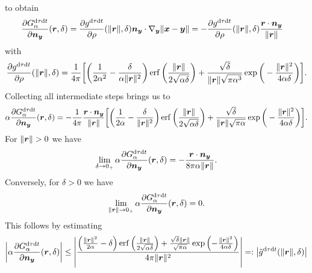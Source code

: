\documentclass[a4paper,11pt]{article}
\begin{document}
to obtain
\begin{equation}
\label{eq:dn_G_dt_dtau}
\begin{aligned}
  \frac{\partial G^{{\mathrm{d}}\tau{\mathrm{d}} t}_\alpha}{\partial {\ensuremath{{\bm{n}}}}_{{\bm{y}}}}({{\bm{r}}},\delta) &= \frac{\partial g^{{\mathrm{d}}\tau{\mathrm{d}} t}}{\partial \rho}(\|{{\bm{r}}}\|,\delta) {{\bm{n}}}_{{\bm{y}}} \cdot \nabla_{{\bm{y}}} \|{{\bm{x}}}-{{\bm{y}}}\| 
  = - \frac{\partial g^{{\mathrm{d}}\tau{\mathrm{d}} t}}{\partial \rho}(\|{{\bm{r}}}\|,\delta) \frac{ {{\bm{r}}} \cdot {\ensuremath{{\bm{n}}}}_{{\bm{y}}}}{\| {{\bm{r}}}\|}
\end{aligned}
\end{equation}
with
\begin{equation*}
  \frac{\partial g^{{\mathrm{d}}\tau{\mathrm{d}} t}}{\partial \rho}(\|{{\bm{r}}}\|,\delta) =\frac{1}{4\pi} \bigg[  \bigg( \frac{1}{2\alpha^2} - \frac{\delta}{\alpha\|{{\bm{r}}}\|^2} \bigg) \operatorname{erf}\bigg( \frac{\|{{\bm{r}}}\|}{2\sqrt{\alpha\delta}} \bigg) + \frac{\sqrt{\delta}}{\|{{\bm{r}}}\|\sqrt{\pi\alpha^3}} \exp \bigg( -\frac{\|{{\bm{r}}}\|^2}{4\alpha\delta} \bigg) \bigg].
\end{equation*}
Collecting all intermediate steps brings us to
\begin{align*}
  \alpha\frac{\partial G^{{\mathrm{d}}\tau{\mathrm{d}} t}_\alpha}{\partial {\ensuremath{{\bm{n}}}}_{{\bm{y}}}}({{\bm{r}}},\delta) = -\frac{1}{4\pi} \frac{ {{\bm{r}}} \cdot {\ensuremath{{\bm{n}}}}_{{\bm{y}}}}{\|{{\bm{r}}}\|}\bigg[  \bigg( \frac{1}{2\alpha} - \frac{\delta}{\|{{\bm{r}}}\|^2} \bigg) \operatorname{erf}\bigg( \frac{\|{{\bm{r}}}\|}{2\sqrt{\alpha\delta}} \bigg) + \frac{\sqrt{\delta}}{\|{{\bm{r}}}\|\sqrt{\pi\alpha}} \exp \bigg( -\frac{\|{{\bm{r}}}\|^2}{4\alpha\delta} \bigg) \bigg].
\end{align*}
For $\|\vr\|>0$ we have
\begin{equation*}
  \lim_{\delta \to 0_+}  \alpha\frac{\partial G^{{\mathrm{d}}\tau{\mathrm{d}} t}_\alpha}{\partial {\ensuremath{{\bm{n}}}}_{{\bm{y}}}}({{\bm{r}}},\delta)  = -\frac{{{\bm{r}}} \cdot {\ensuremath{{\bm{n}}}}_{{\bm{y}}}}{8 \pi\alpha \| {{\bm{r}}}\|}.
\end{equation*}
Conversely, for $\delta > 0$ we have
\begin{equation*} 
  \lim_{\|{{\bm{r}}}\| \to 0_+} \alpha\frac{\partial G^{{\mathrm{d}}\tau{\mathrm{d}} t}_\alpha}{\partial {\ensuremath{{\bm{n}}}}_{{\bm{y}}}}({{\bm{r}}},\delta) = 0.
\end{equation*}
This follows by estimating 
\begin{equation*}
	\left| \alpha\frac{\partial G_\alpha^{{\mathrm{d}}\tau {\mathrm{d}} t}}{\partial {\ensuremath{{\bm{n}}}}_{{\bm{y}}}}
	({{\bm{r}}}, \delta) \right| 
	\leq \left| 
	\frac{\left(\frac{\| {{\bm{r}}} \|^2}{2\alpha} - \delta \right)
	\operatorname{erf}\left(\frac{\| {{\bm{r}}} \|}{2\sqrt{\alpha\delta}}  \right)
	+ \frac{\sqrt{\delta} \| {{\bm{r}}} \|}{\sqrt{\pi\alpha}} 
	\exp \left( -\frac{\| {{\bm{r}}}\|^2}{4\alpha \delta} \right)}
	{4 \pi \| {{\bm{r}}}\|^2 }
	 \right| =: \big|\tilde g^{{\mathrm{d}} \tau {\mathrm{d}} t}(\|{{\bm{r}}} \|, \delta)\big|
\end{equation*}
\end{document}
